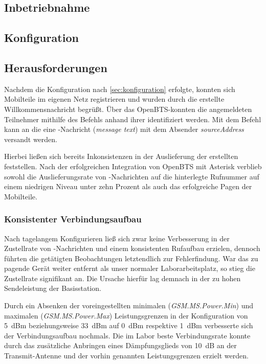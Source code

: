 \subsection{Inbetriebnahme}
\label{sec:inbetriebnahme}

\subsection{Konfiguration}
\label{sec:konfiguration}

\subsection{Herausforderungen}
Nachdem die Konfiguration nach \autoref{sec:konfiguration} erfolgte, konnten sich Mobilteile im eigenen Netz registrieren und wurden durch die erstellte Willkommensnachricht begrüßt.
Über das OpenBTS-\CLI konnten die angemeldeten Teilnehmer mithilfe des Befehls  anhand ihrer \IMSI identifiziert werden. Mit dem Befehl  kann an die \emph{\IMSI} eine \SMS-Nachricht (\emph{message text}) mit dem Absender \emph{sourceAddress} versandt werden.

Hierbei ließen sich bereits Inkonsistenzen in der Auslieferung der erstellten \SMS feststellen. Nach der erfolgreichen Integration von OpenBTS mit Asterisk verblieb sowohl die Auslieferungsrate von \SMS-Nachrichten auf die hinterlegte Rufnummer auf einem niedrigen Niveau unter zehn Prozent als auch das erfolgreiche Pagen der Mobilteile.
\subsubsection{Konsistenter Verbindungsaufbau}
Nach tagelangem Konfigurieren ließ sich zwar keine Verbesserung in der Zustellrate von \SMS-Nachrichten und einem konsistenten Rufaufbau erzielen, dennoch führten die getätigten Beobachtungen letztendlich zur Fehlerfindung. War das zu pagende Gerät weiter entfernt als unser normaler Laborarbeitsplatz, so stieg die Zustellrate signifikant an.
Die Ursache hierfür lag demnach in der zu hohen Sendeleistung der Basisstation.

Durch ein Absenken der voreingestellten minimalen (\emph{GSM.MS.Power.Min}) und maximalen (\emph{GSM.MS.Power.Max}) Leistungsgrenzen in der Konfiguration von \SI{5}{dBm} beziehungsweise \SI{33}{dBm} auf \SI{0}{dBm} respektive \SI{1}{dBm} verbesserte sich der Verbindungsaufbau nochmals. 
Die im Labor beste Verbindungsrate konnte durch das zusätzliche Anbringen eines Dämpfungsglieds von \SI{10}{dB} an der Transmit-Antenne und der vorhin genannten Leistungsgrenzen erzielt werden.

